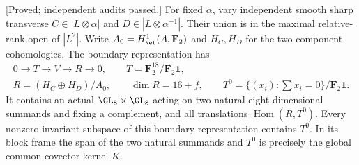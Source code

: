 \begin{lemma}
\label{lem:nonordinary-ppav-two-boundary-gluing-candidate}
\textup{[Proved; independent audits passed.]}
For fixed $\alpha$, vary independent smooth sharp transverse
$C\in|L\otimes\alpha|$ and $D\in|L\otimes\alpha^{-1}|$.
Their union is in the maximal relative-rank open of $|L^2|$.
Write $A_0=H^1_{\et}(A,\mathbf F_2)$ and $H_C,H_D$ for the two
component cohomologies. The boundary representation has
\[
 \begin{gathered}
 0\longrightarrow T\longrightarrow V\longrightarrow R\longrightarrow0,
 \qquad T=\mathbf F_2^{18}/\mathbf F_2\mathbf1,\\
 R=(H_C\oplus H_D)/A_0,
 \qquad \dim R=16+f,\qquad
 T^0=\{(x_i):\sum x_i=0\}/\mathbf F_2\mathbf1.
 \end{gathered}
\]
It contains an actual $\GL_8\times\GL_8$ acting on two natural
eight-dimensional summands and fixing a complement, and all
translations $\operatorname{Hom}(R,T^0)$. Every nonzero invariant
subspace of this boundary representation contains $T^0$.
In its block frame the span of the two natural summands and $T^0$
is precisely the global common covector kernel $K$.
\end{lemma}
